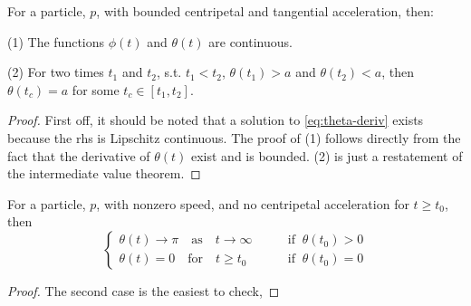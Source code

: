 \begin{lemma}
  For a particle, $p$, with bounded centripetal and tangential acceleration, then: 

  (1) The functions $\phi(t)$ and $\theta(t)$ are continuous. 

  (2) For two times $t_1$ and $t_2$, s.t. $t_1 < t_2$, $\theta(t_1) > a$ and $\theta(t_2) < a$, then $\theta(t_c) = a$ for some $t_c \in [t_1, t_2]$.
\end{lemma}

\begin{proof}
First off, it should be noted that a solution to \ref{eq:theta-deriv} exists because the rhs is Lipschitz continuous. The proof of (1) follows directly from the fact that the derivative of $\theta(t)$ exist and is bounded. (2) is just a restatement of the intermediate value theorem.
\end{proof}

\begin{lemma}
  For a particle, $p$, with nonzero speed, and no centripetal acceleration for $t \ge t_0$, then
  \[
    \begin{cases}
      \theta(t) \to \pi \quad \text{as} \quad t \to \infty \qquad &\text{if} \;\; \theta(t_0) > 0\\
      \theta(t) = 0 \quad \text{for} \quad t \ge t_0 \qquad &\text{if} \;\; \theta(t_0) = 0
    \end{cases}
  \]
\end{lemma}

\begin{proof}
The second case is the easiest to check, 


\end{proof}